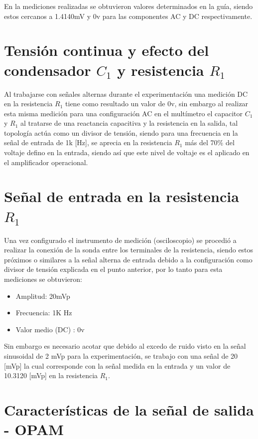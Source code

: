 \documentclass[conference]{IEEEtran}
\begin{document}
	En la mediciones realizadas se obtuvieron valores determinados en la guía, siendo estos cercanos a 1.4140mV y 0v para las componentes AC y DC respectivamente.
	
	\section{Tensión continua y efecto del condensador $C_1$ y resistencia $R_1$}
	
	Al trabajarse con señales alternas durante el experimentación una medición DC en la resistencia $R_1$ tiene como resultado un valor de 0v, sin embargo al realizar esta misma medición para una configuración AC en el multímetro el capacitor $C_1$ y $R_1$ al tratarse de una reactancia capacitiva y la resistencia en la salida, tal topología actúa como un divisor de tensión, siendo para una frecuencia en la señal de entrada de 1k [Hz], se aprecia en la resistencia $R_1$ más del 70\% del voltaje defino en la entrada, siendo así que este nivel de voltaje es el aplicado en el amplificador operacional.
	
	\section{Señal de entrada en la resistencia $R_1$}
	
	Una vez configurado el instrumento de medición (osciloscopio) se procedió a realizar la conexión de la sonda entre los terminales de la resistencia, siendo estos próximos o similares a la señal alterna de entrada debido a la configuración como divisor de tensión explicada en el punto anterior, por lo tanto para esta mediciones se obtuvieron:
	
	\begin{itemize}
		\item Amplitud: 20mVp
		\item Frecuencia: 1K Hz
		\item Valor medio (DC) : 0v
	\end{itemize}
	
	Sin embargo es necesario acotar que debido al excedo de ruido visto en la señal sinusoidal de 2 mVp para la experimentación, se trabajo con una señal de 20 [mVp] la cual corresponde con la señal medida en la entrada y un valor de 10.3120 [mVp] en la resistencia $R_1$.
	
	\section{Características de la señal de salida - OPAM}
	
\end{document}
